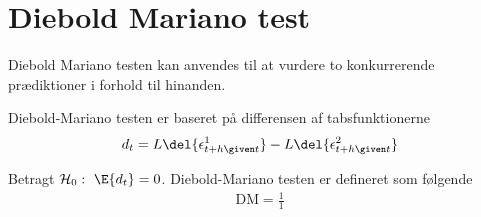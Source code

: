 \section{Diebold Mariano test}
Diebold Mariano testen kan anvendes til at vurdere to konkurrerende prædiktioner i forhold til hinanden.


Diebold-Mariano testen er baseret på differensen af tabsfunktionerne
\begin{align*}
d_t = L \del{\epsilon_{t+h \given t}^1} - L \del{\epsilon_{t+h \given t}^2}
\end{align*}
%
\begin{defn}
Betragt $\mathcal{H}_0: \ \E{d_t}=0$.
Diebold-Mariano testen er defineret som følgende
\begin{align*}
\text{DM}=\frac{1}{1}
\end{align*}
\end{defn}
